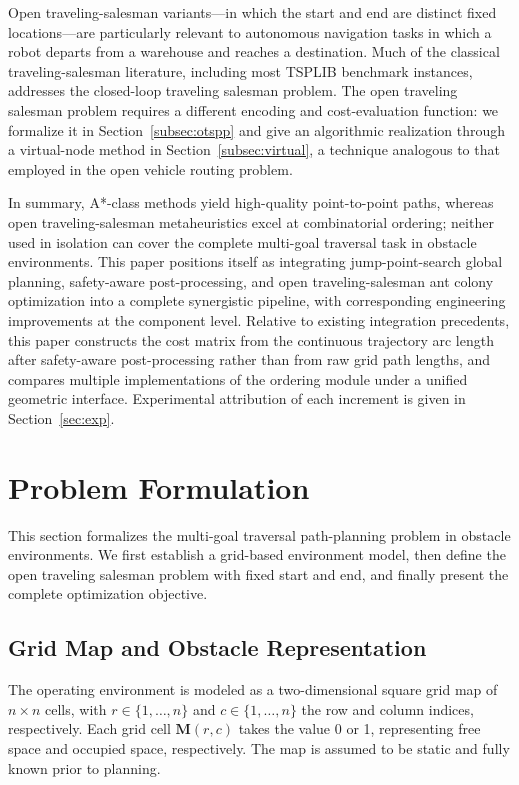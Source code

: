 \documentclass[pdflatex,sn-basic,Numbered]{sn-jnl}
\begin{document}
Open traveling-salesman variants---in which the start and end are distinct fixed locations---are particularly relevant to autonomous navigation tasks in which a robot departs from a warehouse and reaches a destination. Much of the classical traveling-salesman literature, including most TSPLIB benchmark instances, addresses the closed-loop traveling salesman problem. The open traveling salesman problem requires a different encoding and cost-evaluation function: we formalize it in Section~\ref{subsec:otspp} and give an algorithmic realization through a virtual-node method in Section~\ref{subsec:virtual}, a technique analogous to that employed in the open vehicle routing problem\cite{ref32}.

In summary, A*-class methods yield high-quality point-to-point paths, whereas open traveling-salesman metaheuristics excel at combinatorial ordering; neither used in isolation can cover the complete multi-goal traversal task in obstacle environments. This paper positions itself as integrating jump-point-search global planning, safety-aware post-processing, and open traveling-salesman ant colony optimization into a complete synergistic pipeline, with corresponding engineering improvements at the component level. Relative to existing integration precedents\cite{ref1,ref2}, this paper constructs the cost matrix from the continuous trajectory arc length after safety-aware post-processing rather than from raw grid path lengths, and compares multiple implementations of the ordering module under a unified geometric interface. Experimental attribution of each increment is given in Section~\ref{sec:exp}.

\section{Problem Formulation}
\label{sec:form}

This section formalizes the multi-goal traversal path-planning problem in obstacle environments. We first establish a grid-based environment model, then define the open traveling salesman problem with fixed start and end, and finally present the complete optimization objective.

\subsection{Grid Map and Obstacle Representation}

The operating environment is modeled as a two-dimensional square grid map of $n \times n$ cells, with $r \in \{1, \dots, n\}$ and $c \in \{1, \dots, n\}$ the row and column indices, respectively. Each grid cell $\mathbf{M}(r, c)$ takes the value 0 or 1, representing free space and occupied space, respectively. The map is assumed to be static and fully known prior to planning.
\end{document}
